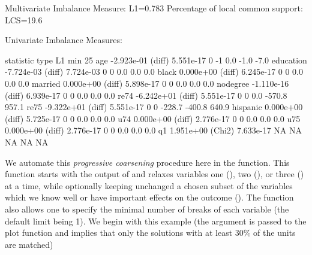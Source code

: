 \documentclass[article]{jss}
\begin{document}
\begin{Schunk}
\begin{Soutput}
Multivariate Imbalance Measure: L1=0.783
Percentage of local common support: LCS=19.6%

Univariate Imbalance Measures:

           statistic   type        L1 min 25%
age       -2.923e-01 (diff) 5.551e-17   0  -1    0.0   -1.0  -7.0
education -7.724e-03 (diff) 7.724e-03   0   0    0.0    0.0   0.0
black      0.000e+00 (diff) 6.245e-17   0   0    0.0    0.0   0.0
married    0.000e+00 (diff) 5.898e-17   0   0    0.0    0.0   0.0
nodegree  -1.110e-16 (diff) 6.939e-17   0   0    0.0    0.0   0.0
re74      -6.242e+01 (diff) 5.551e-17   0   0    0.0 -570.8 957.1
re75      -9.322e+01 (diff) 5.551e-17   0   0 -228.7 -400.8 640.9
hispanic   0.000e+00 (diff) 5.725e-17   0   0    0.0    0.0   0.0
u74        0.000e+00 (diff) 2.776e-17   0   0    0.0    0.0   0.0
u75        0.000e+00 (diff) 2.776e-17   0   0    0.0    0.0   0.0
q1         1.951e+00 (Chi2) 7.633e-17  NA  NA     NA     NA    NA
\end{Soutput}
\end{Schunk}

We automate this \emph{progressive coarsening} procedure here in the
 function.  This function starts with the output of
 and relaxes variables one (), two
(), or three () at a time, while
optionally keeping unchanged a chosen subset of the variables which we
know well or have important effects on the outcome ().
The function also allows one to specify the minimal number of breaks
of each variable (the default limit being 1).  We begin with this
example (the argument  is passed to the plot function
and implies that only the solutions with at least 30\% of the units
are matched)
\end{document}
